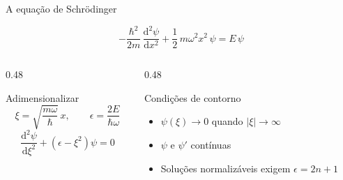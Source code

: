 \begin{frame}{A equação de Schrödinger}
  \begin{equacao}
    \[
      -\frac{\hbar^2}{2m}\,\frac{\mathrm{d}^2\psi}{\mathrm{d}x^2}
      + \frac12\,m\omega^2 x^2\,\psi
      = E\,\psi
    \]
  \end{equacao}

  \begin{columns}[T,onlytextwidth]
    \begin{column}{0.48\textwidth}
      \begin{destaque}{Adimensionalizar}
        \[
          \xi = \sqrt{\frac{m\omega}{\hbar}}\,x,
          \qquad
          \epsilon = \frac{2E}{\hbar\omega}
        \]
        \[
          \frac{\mathrm{d}^2\psi}{\mathrm{d}\xi^2}
          + \left(\epsilon-\xi^2\right)\psi = 0
        \]
      \end{destaque}
    \end{column}
    \begin{column}{0.48\textwidth}
      \begin{destaque}[fisicaviolet]{Condições de contorno}
        \begin{itemize}
          \item $\psi(\xi)\to 0$ quando $|\xi|\to\infty$
          \item $\psi$ e $\psi'$ contínuas
          \item Soluções normalizáveis exigem
                $\epsilon = 2n+1$
        \end{itemize}
      \end{destaque}
    \end{column}
  \end{columns}
\end{frame}
